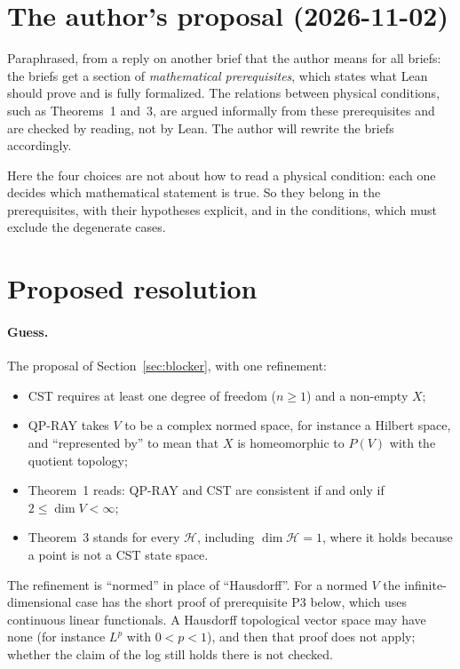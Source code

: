 \documentclass[11pt]{article}
\begin{document}
\section{The author's proposal (2026-11-02)}
Paraphrased, from a reply on another brief that the author means for all briefs: the briefs get
a section of \emph{mathematical prerequisites}, which states what Lean should prove and is fully
formalized. The relations between physical conditions, such as Theorems~1 and~3, are argued
informally from these prerequisites and are checked by reading, not by Lean. The author will
rewrite the briefs accordingly.

Here the four choices are not about how to read a physical condition: each one decides which
mathematical statement is true. So they belong in the prerequisites, with their hypotheses
explicit, and in the conditions, which must exclude the degenerate cases.

\section{Proposed resolution}
\paragraph{Guess.} The proposal of Section~\ref{sec:blocker}, with one refinement:
\begin{itemize}
\item CST requires at least one degree of freedom ($n \ge 1$) and a non-empty $X$;
\item QP-RAY takes $V$ to be a complex normed space, for instance a Hilbert space, and
  ``represented by'' to mean that $X$ is homeomorphic to $P(V)$ with the quotient topology;
\item Theorem~1 reads: QP-RAY and CST are consistent if and only if $2 \le \dim V < \infty$;
\item Theorem~3 stands for every $\mathcal H$, including $\dim\mathcal H = 1$, where it holds
  because a point is not a CST state space.
\end{itemize}
The refinement is ``normed'' in place of ``Hausdorff''. For a normed $V$ the infinite-dimensional
case has the short proof of prerequisite P3 below, which uses continuous linear functionals. A
Hausdorff topological vector space may have none (for instance $L^p$ with $0 < p < 1$), and then
that proof does not apply; whether the claim of the log still holds there is not checked.
\end{document}
